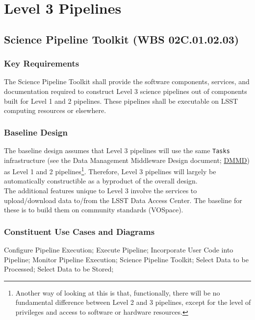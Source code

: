 \documentclass[12pt]{article}
\newcommand{\ds}[2]{{\color{blue} \href{https://docushare.lsstcorp.org/docushare/dsweb/Get/#1}{#2}}\xspace}
\newcommand{\DMMD}{\ds{LDM-152}{DMMD}}
\newcommand{\wbsSPT}{WBS 02C.01.02.03}
\begin{document}
\clearpage

\section{Level 3 Pipelines}

\subsection{Science Pipeline Toolkit (\wbsSPT)}

\subsubsection{Key Requirements}

The Science Pipeline Toolkit shall provide the software components, services, and documentation required to construct Level 3 science pipelines out of components built for Level 1 and 2 pipelines. These pipelines shall be executable on LSST computing resources or elsewhere.

\subsubsection{Baseline Design}

The baseline design assumes that Level 3 pipelines will use the same {\tt Tasks} infrastructure (see the Data Management Middleware Design document; \DMMD) as Level 1 and 2 pipelines\footnote{Another way of looking at this is that, functionally, there will be no fundamental difference between Level 2 and 3 pipelines, except for the level of privileges and access to software or hardware resources.}. Therefore, Level 3 pipelines will largely be automatically constructible as a byproduct of the overall design.
\\

The additional features unique to Level 3 involve the services to upload/download data to/from the LSST Data Access Center. The baseline for these is to build them on community standards (VOSpace).

\subsubsection{Constituent Use Cases and Diagrams}

Configure Pipeline Execution; Execute Pipeline; Incorporate User Code into Pipeline; Monitor Pipeline Execution; Science Pipeline Toolkit; Select Data to be Processed; Select Data to be Stored;
\end{document}
